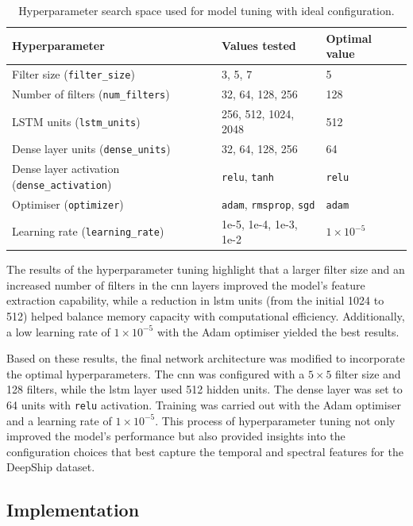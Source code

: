 \begin{table}[htbp] 
\centering 
\caption{Hyperparameter search space used for model tuning with ideal configuration.} 
\label{tab:hyperparameter-search-space} 
    \begin{tabular}{lll} 
    \toprule 
    \textbf{Hyperparameter} & \textbf{Values tested} & \textbf{Optimal value} \\ 
    \midrule 
    Filter size (\texttt{filter\_size}) & 3, 5, 7 & 5 \\ 
    Number of filters (\texttt{num\_filters}) & 32, 64, 128, 256 & 128 \\ 
    LSTM units (\texttt{lstm\_units}) & 256, 512, 1024, 2048 & 512 \\ 
    Dense layer units (\texttt{dense\_units}) & 32, 64, 128, 256 & 64 \\ 
    Dense layer activation (\texttt{dense\_activation}) & \texttt{relu}, \texttt{tanh} & \texttt{relu} \\ 
    Optimiser (\texttt{optimizer}) & \texttt{adam}, \texttt{rmsprop}, \texttt{sgd} & \texttt{adam} \\ 
    Learning rate (\texttt{learning\_rate}) & 1e-5, 1e-4, 1e-3, 1e-2 & $1 \times 10^{-5}$ \\ 
    \bottomrule 
    \end{tabular} 
\end{table}

The results of the hyperparameter tuning highlight that a larger filter size and an increased number of filters in the \acrshort{cnn} layers improved the model's feature extraction capability, while a reduction in \acrshort{lstm} units (from the initial 1024 to 512) helped balance memory capacity with computational efficiency. Additionally, a low learning rate of $1 \times 10^{-5}$ with the Adam optimiser yielded the best results.

Based on these results, the final network architecture was modified to incorporate the optimal hyperparameters. The \acrshort{cnn} was configured with a $5\times5$ filter size and 128 filters, while the \acrshort{lstm} layer used 512 hidden units. The dense layer was set to 64 units with \texttt{relu} activation. Training was carried out with the Adam optimiser and a learning rate of $1 \times 10^{-5}$. This process of hyperparameter tuning not only improved the model's performance but also provided insights into the configuration choices that best capture the temporal and spectral features for the DeepShip dataset.

\subsection{Implementation}

